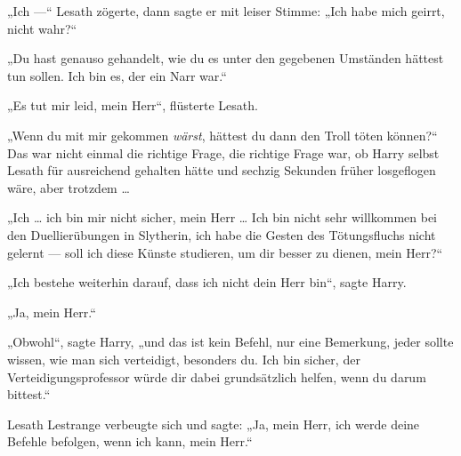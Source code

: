 „Ich —“ Lesath zögerte, dann sagte er mit leiser Stimme:
„Ich habe mich geirrt, nicht wahr?“

„Du hast genauso gehandelt, wie du es unter den gegebenen Umständen hättest tun sollen. Ich bin es, der ein Narr war.“

„Es tut mir leid, mein Herr“, flüsterte Lesath.

„Wenn du mit mir gekommen \emph{wärst}, hättest du dann den Troll töten können?“ Das war nicht einmal die richtige Frage, die richtige Frage war, ob Harry selbst Lesath für ausreichend gehalten hätte und sechzig Sekunden früher losgeflogen wäre, aber trotzdem …

„Ich … ich bin mir nicht sicher, mein Herr … Ich bin nicht sehr willkommen bei den Duellierübungen in Slytherin, ich habe die Gesten des Tötungsfluchs nicht gelernt — soll ich diese Künste studieren, um dir besser zu dienen, mein Herr?“

„Ich bestehe weiterhin darauf, dass ich nicht dein Herr bin“, sagte Harry.

„Ja, mein Herr.“

„Obwohl“, sagte Harry, „und das ist kein Befehl, nur eine Bemerkung, jeder sollte wissen, wie man sich verteidigt, besonders du. Ich bin sicher, der Verteidigungsprofessor würde dir dabei grundsätzlich helfen, wenn du darum bittest.“

Lesath Lestrange verbeugte sich und sagte:
„Ja, mein Herr, ich werde deine Befehle befolgen, wenn ich kann, mein Herr.“

